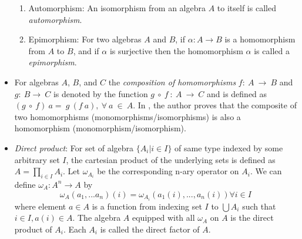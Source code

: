 \begin{itemize}
\begin{enumerate}
        \item Automorphism: An isomorphism from an algebra $A$ to itself is
        called \textit{automorphism}.

        \item Epimorphism: For two algebras $A$ and $B$, if \(\alpha : A
        \rightarrow B \) is a homomorphism from $A$ to $B$, and if \(\alpha\) is
        surjective then the homomorphism \(\alpha\) is called a
        \textit{epimorphism}.
    \end{enumerate}

    \item For algebras $A$, $B$, and $C$ the \textit{composition of
    homomorphisms} $f:\ A \ \rightarrow \ B$ and $g:\ B \rightarrow\ C$ is
    denoted by the function $g\ \circ \ f\ :\ A\ \rightarrow \ C$ and is defined
    as $(g\ \circ \ f)\ a = \ g\ (f\ a), \ \forall \ a\ \in\ A$. In
    \cite{sankappanavar1981course}, the author proves that the composite of two
    homomorphisms (monomorphisms/isomorphisms) is also a homomorphism
    (monomorphism/isomorphism).
    
    \item \textit{Direct product}: For set of algebra $\{ A_i | i \in I \}$ of
    same type indexed by some arbitrary set $I$, the cartesian product of the
    underlying sets is defined as $A = \displaystyle \prod_{i\in I} A_i$. Let
    $\omega_{A_i}$ be the corresponding n-ary operator on $A_i$. We can define
    $\omega_A : A^{n} \rightarrow A$ by \[ \omega_A(a_1,...a_n)(i) =
    \omega_{A_i} (a_1(i),...,a_n(i)) \forall i \in I\] where element $a \in A$
    is a function from indexing set $I$ to $\bigcup A_i$ such that $i \in I,
    a(i) \in A$. The algebra $A$ equipped with all $\omega_A$ on $A$ is the
    direct product of $A_i$. Each $A_i$ is called the direct factor of $A$.

\end{itemize}